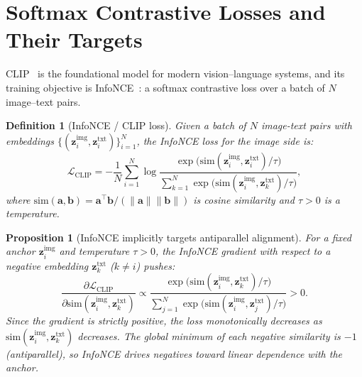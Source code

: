 \documentclass[11pt,a4paper]{article}
\newtheorem{proposition}[theorem]{Proposition}
\newtheorem{definition}[theorem]{Definition}
\theoremstyle{remark}
\begin{document}
\section{Softmax Contrastive Losses and Their Targets}
\label{sec:clip}

CLIP~\cite{radford2021clip} is the foundational model for modern vision--language systems, and its training objective is InfoNCE~\cite{oord2018infonce}: a softmax contrastive loss over a batch of $N$ image--text pairs.

\begin{definition}[InfoNCE / CLIP loss]
\label{def:infonce}
Given a batch of $N$ image-text pairs with embeddings $\{(\mathbf{z}^\text{img}_i, \mathbf{z}^\text{txt}_i)\}_{i=1}^N$, the InfoNCE loss for the image side is:
\begin{equation}
  \mathcal{L}_\text{CLIP} = -\frac{1}{N}\sum_{i=1}^N \log \frac{\exp\bigl(\mathrm{sim}(\mathbf{z}^\text{img}_i, \mathbf{z}^\text{txt}_i)/\tau\bigr)}{\sum_{k=1}^N \exp\bigl(\mathrm{sim}(\mathbf{z}^\text{img}_i, \mathbf{z}^\text{txt}_k)/\tau\bigr)},
  \label{eq:infonce}
\end{equation}
where $\mathrm{sim}(\mathbf{a}, \mathbf{b}) = \mathbf{a}^\top\mathbf{b} / (\|\mathbf{a}\|\|\mathbf{b}\|)$ is cosine similarity and $\tau > 0$ is a temperature.
\end{definition}

\begin{proposition}[InfoNCE implicitly targets antiparallel alignment]
\label{prop:infonce-target}
For a fixed anchor $\mathbf{z}^\text{img}_i$ and temperature $\tau > 0$, the InfoNCE gradient with respect to a negative embedding $\mathbf{z}^\text{txt}_k$ ($k \neq i$) pushes:
\begin{equation}
  \frac{\partial \mathcal{L}_\text{CLIP}}{\partial \mathrm{sim}(\mathbf{z}^\text{img}_i, \mathbf{z}^\text{txt}_k)} \propto \frac{\exp\bigl(\mathrm{sim}(\mathbf{z}^\text{img}_i, \mathbf{z}^\text{txt}_k)/\tau\bigr)}{\sum_{j=1}^N \exp\bigl(\mathrm{sim}(\mathbf{z}^\text{img}_i, \mathbf{z}^\text{txt}_j)/\tau\bigr)} > 0.
  \label{eq:infonce-grad}
\end{equation}
Since the gradient is strictly positive, the loss monotonically decreases as $\mathrm{sim}(\mathbf{z}^\text{img}_i, \mathbf{z}^\text{txt}_k)$ decreases.
The global minimum of each negative similarity is $-1$ (antiparallel), so InfoNCE drives negatives toward linear dependence with the anchor.
\end{proposition}
\end{document}
